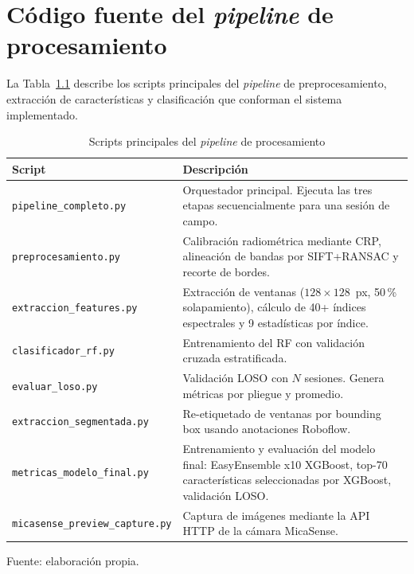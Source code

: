 
\chapter{Código fuente del \textit{pipeline} de procesamiento}
\label{anx:codigo}

La Tabla~\ref{tab:scripts} describe los scripts principales del
\textit{pipeline} de preprocesamiento, extracción de características y
clasificación que conforman el sistema implementado.

\begin{table}[H]
\centering
\caption{Scripts principales del \textit{pipeline} de procesamiento}
\label{tab:scripts}
\small
\begin{tabular}{p{6.0cm}p{6.5cm}}
\toprule
\textbf{Script} & \textbf{Descripción} \\
\midrule
\texttt{pipeline\_completo.py}
  & Orquestador principal. Ejecuta las tres etapas secuencialmente para una sesión de campo. \\[4pt]
\texttt{preprocesamiento.py}
  & Calibración radiométrica mediante \ac{CRP}, alineación de bandas por \ac{SIFT}+RANSAC y recorte de bordes. \\[4pt]
\texttt{extraccion\_features.py}
  & Extracción de ventanas ($128\times128$~px, 50\,\% solapamiento), cálculo de 40+ índices espectrales y 9 estadísticas por índice. \\[4pt]
\texttt{clasificador\_rf.py}
  & Entrenamiento del \ac{RF} con validación cruzada estratificada. \\[4pt]
\texttt{evaluar\_loso.py}
  & Validación \ac{LOSO} con $N$ sesiones. Genera métricas por pliegue y promedio. \\[4pt]
\texttt{extraccion\_segmentada.py}
  & Re-etiquetado de ventanas por bounding box usando anotaciones Roboflow. \\[4pt]
\texttt{metricas\_modelo\_final.py}
  & Entrenamiento y evaluación del modelo final: EasyEnsemble x10 XGBoost,
    top-70 características seleccionadas por XGBoost, validación \ac{LOSO}. \\[4pt]
\texttt{micasense\_preview\_capture.py}
  & Captura de imágenes mediante la API HTTP de la cámara MicaSense. \\
\bottomrule
\end{tabular}

  {\footnotesize Fuente: elaboración propia.}
\end{table}

